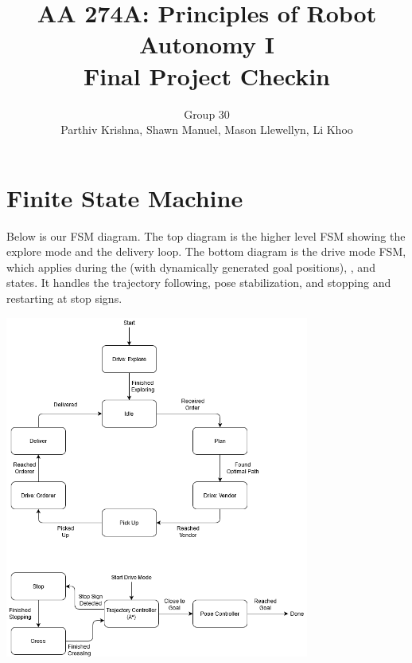\documentclass{article}
\title{AA 274A: Principles of Robot Autonomy I \\ Final Project Checkin}
\author{Group 30 \\ Parthiv Krishna, Shawn Manuel, Mason Llewellyn, Li Khoo}
\date{}
\begin{document}
\maketitle
\pagestyle{fancy} 

\section*{Finite State Machine}
Below is our FSM diagram. The top diagram is the higher level FSM showing the explore mode and the delivery loop. The bottom diagram is the drive mode FSM, which applies during the  (with dynamically generated goal positions), , and  states. It handles the trajectory following, pose stabilization, and stopping and restarting at stop signs. 
\begin{center}
\includegraphics[width=0.75\textwidth]{fsm.png}
\end{center}
\end{document}
